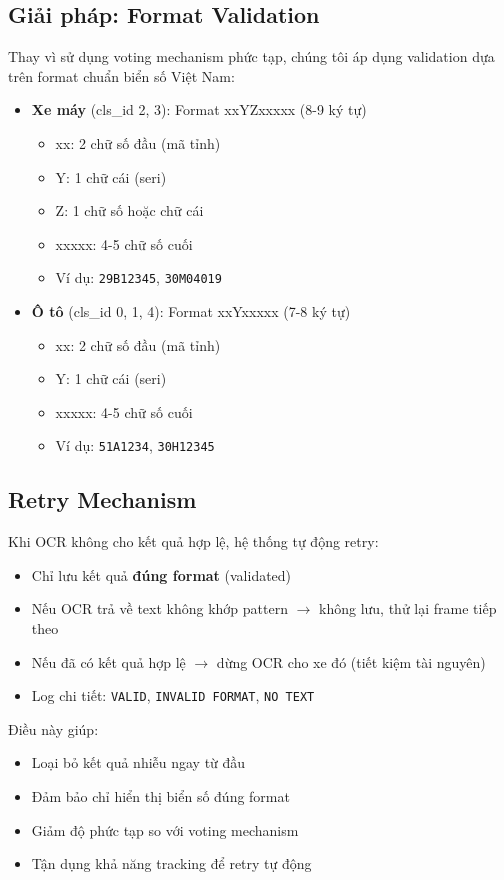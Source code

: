 \subsection{Giải pháp: Format Validation}
Thay vì sử dụng voting mechanism phức tạp, chúng tôi áp dụng validation dựa trên format chuẩn biển số Việt Nam:
\begin{itemize}
    \item \textbf{Xe máy} (cls\_id 2, 3): Format xxYZxxxxx (8-9 ký tự)
    \begin{itemize}
        \item xx: 2 chữ số đầu (mã tỉnh)
        \item Y: 1 chữ cái (seri)
        \item Z: 1 chữ số hoặc chữ cái
        \item xxxxx: 4-5 chữ số cuối
        \item Ví dụ: \texttt{29B12345}, \texttt{30M04019}
    \end{itemize}
    \item \textbf{Ô tô} (cls\_id 0, 1, 4): Format xxYxxxxx (7-8 ký tự)
    \begin{itemize}
        \item xx: 2 chữ số đầu (mã tỉnh)
        \item Y: 1 chữ cái (seri)
        \item xxxxx: 4-5 chữ số cuối
        \item Ví dụ: \texttt{51A1234}, \texttt{30H12345}
    \end{itemize}
\end{itemize}

\subsection{Retry Mechanism}
Khi OCR không cho kết quả hợp lệ, hệ thống tự động retry:
\begin{itemize}
    \item Chỉ lưu kết quả \textbf{đúng format} (validated)
    \item Nếu OCR trả về text không khớp pattern $\rightarrow$ không lưu, thử lại frame tiếp theo
    \item Nếu đã có kết quả hợp lệ $\rightarrow$ dừng OCR cho xe đó (tiết kiệm tài nguyên)
    \item Log chi tiết: \texttt{VALID}, \texttt{INVALID FORMAT}, \texttt{NO TEXT}
\end{itemize}

Điều này giúp:
\begin{itemize}
    \item Loại bỏ kết quả nhiễu ngay từ đầu
    \item Đảm bảo chỉ hiển thị biển số đúng format
    \item Giảm độ phức tạp so với voting mechanism
    \item Tận dụng khả năng tracking để retry tự động
\end{itemize}

